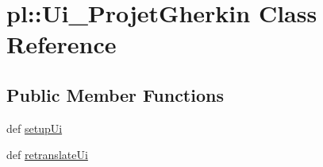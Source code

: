 \hypertarget{classpl_1_1Ui__ProjetGherkin}{
\section{pl::Ui\_\-ProjetGherkin Class Reference}
\label{classpl_1_1Ui__ProjetGherkin}
}
\subsection*{Public Member Functions}
\begin{DoxyCompactItemize}
\item 
def \hyperlink{classpl_1_1Ui__ProjetGherkin_aaf5589dcb44fb055728b1c1ddf8b7e67}{setupUi}
\item 
def \hyperlink{classpl_1_1Ui__ProjetGherkin_a67d8e1108170689923e750ba3c2fda85}{retranslateUi}
\end{DoxyCompactItemize}
